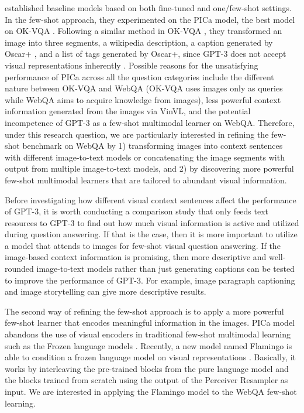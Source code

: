 \documentclass[nohyperref]{article}
\theoremstyle{plain}
\theoremstyle{definition}
\theoremstyle{remark}
\begin{document}
    \citet{webqa} established baseline models based on both fine-tuned and one/few-shot settings. In the few-shot approach, they experimented on the PICa model, the best model on OK-VQA \citep{PICa}. Following a similar method in OK-VQA \citep{okvqa}, they transformed an image into three segments, a wikipedia description, a caption generated by Oscar+ \citep{VinVL}, and a list of tags generated by Oscar+, since GPT-3 does not accept visual representations inherently \citep{GPT3}. Possible reasons for the unsatisfying performance of PICa across all the question categories include the different nature between OK-VQA and WebQA (OK-VQA uses images only as queries while WebQA aims to acquire knowledge from images), less powerful context information generated from the images via VinVL, and the potential incompetence of GPT-3 as a few-shot multimodal learner on WebQA. Therefore, under this research question, we are particularly interested in refining the few-shot benchmark on WebQA by 1) transforming images into context sentences with different image-to-text models or concatenating the image segments with output from multiple image-to-text models, and 2) by discovering more powerful few-shot multimodal learners that are tailored to abundant visual information.

    Before investigating how different visual context sentences affect the performance of GPT-3, it is worth conducting a comparison study that only feeds text resources to GPT-3 to find out how much visual information is active and utilized during question answering. If that is the case, then it is more important to utilize a model that attends to images for few-shot visual question answering. If the image-based context information is promising, then more descriptive and well-rounded image-to-text models rather than just generating captions can be tested to improve the performance of GPT-3. For example, image paragraph captioning \citep{image_paragraph} and image storytelling can give more descriptive results.

    The second way of refining the few-shot approach is to apply a more powerful few-shot learner that encodes meaningful information in the images. PICa model abandons the use of visual encoders in traditional few-shot multimodal learning such as the Frozen language models \citep{frozen}. Recently, a new model named Flamingo is able to condition a frozen language model on visual representations \citep{Flamingo}. Basically, it works by interleaving the pre-trained blocks from the pure language model and the blocks trained from scratch using the output of the Perceiver Resampler as input. We are interested in applying the Flamingo model to the WebQA few-shot learning.
\end{document}
